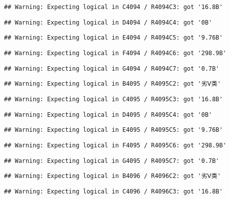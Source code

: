 \documentclass[
]{article}
\begin{document}
\begin{verbatim}
## Warning: Expecting logical in C4094 / R4094C3: got '16.8B'
\end{verbatim}

\begin{verbatim}
## Warning: Expecting logical in D4094 / R4094C4: got '0B'
\end{verbatim}

\begin{verbatim}
## Warning: Expecting logical in E4094 / R4094C5: got '9.76B'
\end{verbatim}

\begin{verbatim}
## Warning: Expecting logical in F4094 / R4094C6: got '298.9B'
\end{verbatim}

\begin{verbatim}
## Warning: Expecting logical in G4094 / R4094C7: got '0.7B'
\end{verbatim}

\begin{verbatim}
## Warning: Expecting logical in B4095 / R4095C2: got '劣Ⅴ类'
\end{verbatim}

\begin{verbatim}
## Warning: Expecting logical in C4095 / R4095C3: got '16.8B'
\end{verbatim}

\begin{verbatim}
## Warning: Expecting logical in D4095 / R4095C4: got '0B'
\end{verbatim}

\begin{verbatim}
## Warning: Expecting logical in E4095 / R4095C5: got '9.76B'
\end{verbatim}

\begin{verbatim}
## Warning: Expecting logical in F4095 / R4095C6: got '298.9B'
\end{verbatim}

\begin{verbatim}
## Warning: Expecting logical in G4095 / R4095C7: got '0.7B'
\end{verbatim}

\begin{verbatim}
## Warning: Expecting logical in B4096 / R4096C2: got '劣Ⅴ类'
\end{verbatim}

\begin{verbatim}
## Warning: Expecting logical in C4096 / R4096C3: got '16.8B'
\end{verbatim}
\end{document}
